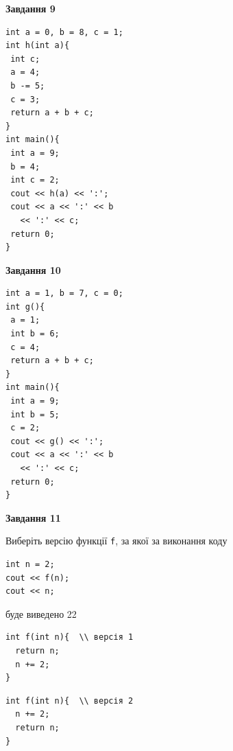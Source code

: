 \documentclass[12pt, ukrainian]{article}
\def\code#1{\Verb!#1!}
\begin{document}
{\begin {large}
\begin{minipage}[t]{11.0cm}
\end{minipage}


\begin{minipage}[t]{7.0cm}

\begin{center}
\textbf{Завдання 9}
\end{center}
\vspace{-8mm}

\begin{verbatim}
int a = 0, b = 8, c = 1;
int h(int a){
 int c;
 a = 4;
 b -= 5;
 c = 3;
 return a + b + c;
}
int main(){
 int a = 9;
 b = 4;
 int c = 2;
 cout << h(a) << ':';
 cout << a << ':' << b 
   << ':' << c;
 return 0;
}
\end{verbatim}



\begin{center}
\textbf{Завдання 10}
\end{center}
\vspace{-8mm}

\begin{verbatim}
int a = 1, b = 7, c = 0;
int g(){
 a = 1;
 int b = 6;
 c = 4;
 return a + b + c;
}
int main(){
 int a = 9;
 int b = 5;
 c = 2;
 cout << g() << ':';
 cout << a << ':' << b 
   << ':' << c;
 return 0;
}
\end{verbatim}

\end{minipage}
\vline \hspace{1mm}
\begin{minipage}[t]{11.0cm}

\begin{center}
\textbf{Завдання 11}
\end{center}
Виберіть версію функції \code{f}, за якої за виконання коду
\begin{verbatim}
int n = 2;
cout << f(n);
cout << n;
\end{verbatim}

буде виведено 22

\begin{verbatim}
int f(int n){  \\ версія 1
  return n;
  n += 2;
}
\end{verbatim}

\vspace{-8mm}\begin{verbatim}
int f(int n){  \\ версія 2
  n += 2;
  return n;
}
\end{verbatim}


\end{minipage}
\end{large}}
\end{document}
